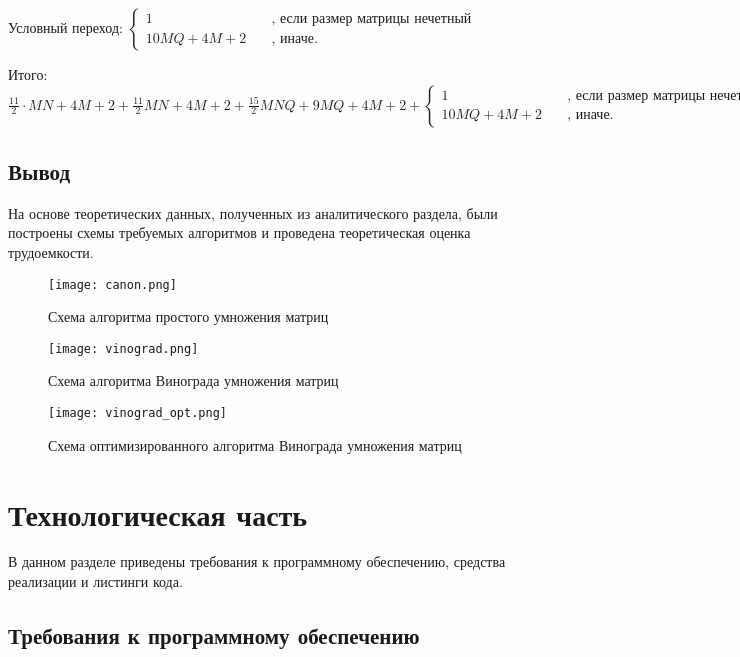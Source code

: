 \noindent
Условный переход: $ \begin{cases}
    1 & \quad \text{, если размер матрицы нечетный} \\
    10 MQ + 4M + 2 & \quad \text{, иначе.}
\end{cases} $

\noindent
Итого: $\frac{11}{2} \cdot MN + 4M + 2 + \frac{11}{2}MN + 4M + 2 + \frac{15}{2}MNQ + 9 MQ + 4M + 2 + \begin{cases}
    1 & \quad \text{, если размер матрицы нечетный} \\
    10 MQ + 4M + 2 & \quad \text{, иначе.}
\end{cases}$

\subsection{Вывод}

На основе теоретических данных, полученных из аналитического раздела, были построены схемы требуемых алгоритмов и проведена теоретическая оценка трудоемкости.

\begin{figure}
    \centering
    \texttt{[image: canon.png]}
    \caption{Схема алгоритма простого умножения матриц}
    \label{img:canon}
\end{figure}

\begin{figure}
    \centering
    \texttt{[image: vinograd.png]}
    \caption{Схема алгоритма Винограда умножения матриц}
    \label{img:vinograd}
\end{figure}

\begin{figure}
    \centering
    \texttt{[image: vinograd\_opt.png]}
    \caption{Схема оптимизированного алгоритма Винограда умножения матриц}
    \label{img:vinograd_opt}
\end{figure}

\section{Технологическая часть}

В данном разделе приведены требования к программному обеспечению, средства реализации и листинги кода.

\subsection{Требования к программному обеспечению}

